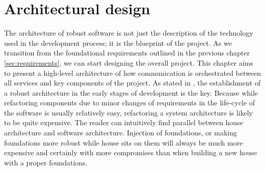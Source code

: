 \chapter{Architectural design}

The architecture of robust software is not just the description of the technology used in the development process; it is the blueprint of the project.
As we transition from the foundational requirements outlined in the previous chapter \ref{sec:requirements}, we can start designing the overall project.
This chapter aims to present a high-level architecture of how communication is orchestrated between all services and key components of the project.
As stated in \cite{sommervilleSW}, the establishment of a robust architecture in the early stages of development is the key.
Because while refactoring components due to minor changes of requirements in the life-cycle of the software is usually relatively easy, refactoring a system architecture is likely to be quite expensive.
The reader can intuitively find parallel between house architecture and software architecture. 
Injection of foundations, or making foundations more robust while house sits on them will always be much more expensive and certainly with more compromises than when building a new house with a proper foundations.


